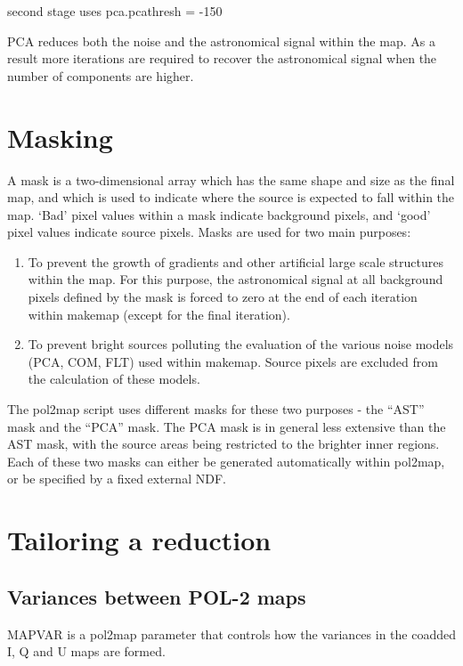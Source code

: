 second stage uses pca.pcathresh = -150


PCA reduces both the noise and the astronomical signal within the map. As
a result more iterations are required to recover the astronomical signal
when the number of components are higher.



\section{Masking}
A mask is a two-dimensional array which has the same shape and size as the final map, and
which is used to indicate where the source is expected to fall within the map. `Bad' pixel values
within a mask indicate background pixels, and `good' pixel values indicate source pixels. Masks
are used for two main purposes:

\begin{enumerate}\itemsep-0.2em
\item To prevent the growth of gradients and other artificial large scale structures within the
map.  For this purpose, the astronomical signal at all background pixels defined by the
mask is forced to zero at the end of each iteration within makemap (except for the final iteration).
\item To prevent bright sources polluting the evaluation of the various noise models (PCA, COM, FLT) used within
makemap. Source pixels are excluded from the calculation of these models.
\end{enumerate}


The pol2map script uses different masks for these two purposes - the “AST” mask and the “PCA” mask.
The PCA mask is in general less extensive than the AST mask, with the source areas being restricted to the brighter inner regions.
Each of these two masks can either be generated automatically within pol2map, or be specified by
a fixed external NDF.



\section{Tailoring a reduction}

\subsection*{Variances between POL-2 maps}

MAPVAR is a pol2map parameter that controls how the variances in the coadded
I, Q and U maps are formed.

